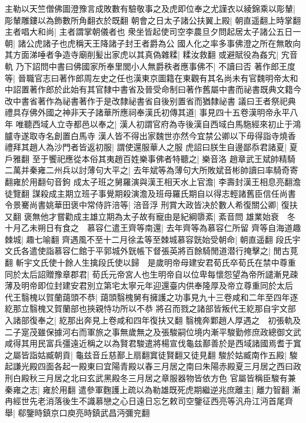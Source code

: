 主勒以天竺僧佛圖澄豫言成敗數有驗敬事之及虎即位奉之尤謹衣以綾錦乘以彫輦|{
	彫輦雕鏤以為飾數所角翻衣於既翻}
朝會之日太子諸公扶翼上殿|{
	朝直遥翻上時掌翻}
主者唱大和尚|{
	主者謂掌朝儀者也}
衆坐皆起使司空李農旦夕問起居太子諸公五日一朝|{
	諸公虎諸子也虎稱天王降諸子封王者爵為公}
國人化之率多事佛澄之所在無敢向其方面涕唾者争造寺廟削髪出家虎以其真偽雜糅|{
	糅汝救翻}
或避賦役為姦宄|{
	宄音軌}
乃下詔問中書曰佛國家所奉里閭小人無爵秩者應事佛不|{
	不讀曰否}
著作郎王度等|{
	晉職官志曰著作郎周左史之任也漢東京圖籍在東觀有其名尚未有官魏明帝太和中詔置著作郎於此始有其官隸中書省及晉受命制曰著作舊屬中書而祕書既典文籍今改中書省著作為祕書著作于是改隸祕書省自後别置省而猶隸祕書}
議曰王者祭祀典禮具存佛外國之神非天子諸華所應祠奉漢氏初傳其道|{
	事見四十五卷漢明帝永平八年}
唯聽西域人立寺都邑以奉之|{
	漢人初謂官府為寺後漢自西域白馬駞經來初止于鴻臚寺遂取寺名創置白馬寺}
漢人皆不得出家魏世亦然今宜禁公卿以下毋得詣寺燒香禮拜其趙人為沙門者皆返初服|{
	謂使還服華人之服}
虎詔曰朕生自邊鄙忝君諸夏|{
	夏戶雅翻}
至于饗祀應從本俗其夷趙百姓樂事佛者特聽之|{
	樂音洛}
趙章武王斌帥精騎二萬并秦雍二州兵以討薄句大平之|{
	去年斌等為薄句大所敗斌音彬帥讀曰率騎奇寄翻雍於用翻句音鉤}
成太子班之舅羅演與漢王相天水上官澹|{
	李壽封漢王相息亮翻澹徒覽翻}
謀殺成主期立班子事覺期殺演澹及班母羅氏期自以得志輕諸舊臣信任尚書令景騫尚書姚華田褒中常侍許涪等|{
	涪音浮}
刑賞大政皆决於數人希復關公卿|{
	復扶又翻}
褒無他才嘗勸成主雄立期為太子故有寵由是紀綱隳紊|{
	紊音問}
雄業始衰　冬十月乙未朔日有食之　慕容仁遣王齊等南還|{
	去年齊等為慕容仁所留}
齊等自海道趣棘城|{
	趣七喻翻}
齊遇風不至十二月徐孟等至棘城慕容皝始受朝命|{
	朝直遥翻}
段氏宇文氏各遣使詣慕容仁館于平郭城外皝帳下督張英將百餘騎閒道潜行掩擊之|{
	閒古莧翻}
斬宇文氏使十餘人生擒段氏使以歸　是歲明帝母建安君荀氏卒荀氏在禁中尊重同於太后詔贈豫章郡君|{
	荀氏元帝宮人也生明帝自以位卑每懷怨望為帝所譴漸見疎薄及明帝即位封建安君別立第宅太寧元年迎還臺内供奉隆厚及帝立尊重同於太后}
代王翳槐以賀蘭藹頭不恭|{
	藹頭翳槐舅有擁護之功事見九十三卷咸和二年至四年逐紇那立翳槐又賀蘭部也挾親恃功所以不恭}
將召而戮之諸部皆叛代王紇那自宇文部入諸部復奉之|{
	紇那出奔見上卷咸和四年復扶又翻}
翳槐奔鄴趙人厚遇之　初張軌及二子寔茂雖保據河右而軍旅之事無歲無之及張駿嗣位境内漸平駿勤修庶政總御文武咸得其用民富兵彊遠近稱之以為賢君駿遣將楊宣伐龜兹鄯善於是西域諸國焉耆于窴之屬皆詣姑臧朝貢|{
	龜兹音丘慈鄯上扇翻窴徒賢翻又徒見翻}
駿於姑臧南作五殿|{
	駿起謙光殿四面各起一殿東曰宜陽青殿以春三月居之南曰朱陽赤殿夏三月居之西曰政刑白殿秋三月居之北曰玄武黑殿冬三月居之章服器物皆依方色}
官屬皆稱臣駿有兼秦雍之志|{
	雍於用翻}
遣參軍麴護上疏以為勒雄既死虎期繼逆兆庶離主|{
	離力智翻}
漸冉經世先老消落後生不識慕戀之心日遠日忘乞敕司空鑒征西亮等汎舟江沔首尾齊舉|{
	郗鑒時鎮京口庾亮時鎮武昌沔彌兖翻}


